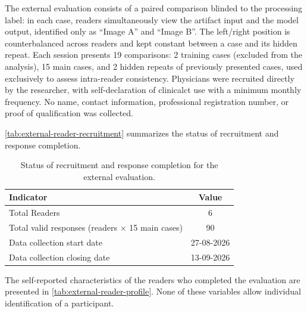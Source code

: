 The external evaluation consists of a paired comparison blinded to the processing label: in each case, readers simultaneously view the artifact input and the model output, identified only as ``Image A'' and ``Image B''. The left/right position is counterbalanced across readers and kept constant between a case and its hidden repeat. Each session presents 19 comparisons: 2 training cases (excluded from the analysis), 15 main cases, and 2 hidden repeats of previously presented cases, used exclusively to assess intra-reader consistency. Physicians were recruited directly by the researcher, with self-declaration of clinical\acrshort{ct} use with a minimum monthly frequency. No name, contact information, professional registration number, or proof of qualification was collected.

\autoref{tab:external-reader-recruitment} summarizes the status of recruitment and response completion.

\begin{table}[htbp]
\centering
\small
\begin{tabular}{lc}
\toprule
\textbf{Indicator} & \textbf{Value} \\
\midrule
Total Readers & 6 \\
Total valid responses (readers $\times$ 15 main cases) & 90 \\
Data collection start date & 27-08-2026 \\
Data collection closing date & 13-09-2026 \\
\bottomrule
\end{tabular}
\captionsetup{skip=2pt}
\caption[Recruitment and completion status]{Status of recruitment and response completion for the external evaluation.}
\label{tab:external-reader-recruitment}
\end{table}
\FloatBarrier

The self-reported characteristics of the readers who completed the evaluation are presented in \autoref{tab:external-reader-profile}. None of these variables allow individual identification of a participant.

